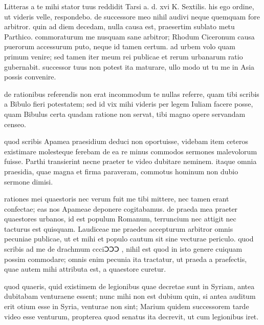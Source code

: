


 Litteras a te mihi stator tuus reddidit Tarsi a. d. xvi K. Sextilis. his ego ordine, ut videris velle, respondebo. de successore meo nihil audivi neque quemquam fore arbitror. quin ad diem decedam, nulla causa est, praesertim sublato metu Parthico. commoraturum me nusquam sane arbitror; Rhodum Ciceronum causa puerorum accessurum puto, neque id tamen certum. ad urbem volo quam primum venire; sed tamen iter meum rei publicae et rerum urbanarum ratio gubernabit. successor tuus non potest ita maturare, ullo modo ut tu me in Asia possis convenire.

 de rationibus referendis non erat incommodum te nullas referre, quam tibi scribis a Bibulo fieri potestatem; sed id vix mihi videris per legem Iuliam facere posse, quam Bibulus certa quadam ratione non servat, tibi magno opere servandam censeo.

 quod scribis Apamea praesidium deduci non oportuisse, videbam item ceteros existimare molesteque ferebam de ea re minus commodos sermones malevolorum fuisse. Parthi transierint necne praeter te video dubitare neminem. itaque omnia praesidia, quae magna et firma paraveram, commotus hominum non dubio sermone dimisi.

 rationes mei quaestoris nec verum fuit me tibi mittere, nec tamen erant confectae; eas nos Apameae deponere cogitabamus. de praeda mea praeter quaestores urbanos, id est populum Romanum, terruncium nec attigit nec tacturus est quisquam. Laudiceae me praedes accepturum arbitror omnis pecuniae publicae, ut et mihi et populo cautum sit sine vecturae periculo. quod scribis ad me de drachmum ccciↃↃↃ , nihil est quod in isto genere cuiquam possim commodare; omnis enim pecunia ita tractatur, ut praeda a praefectis, quae autem mihi attributa est, a quaestore curetur.

 quod quaeris, quid existimem de legionibus quae decretae sunt in Syriam, antea dubitabam venturaene essent; nunc mihi non est dubium quin, si antea auditum erit otium esse in Syria, venturae non sint; Marium quidem successorem tarde video esse venturum, propterea quod senatus ita decrevit, ut cum legionibus iret.

